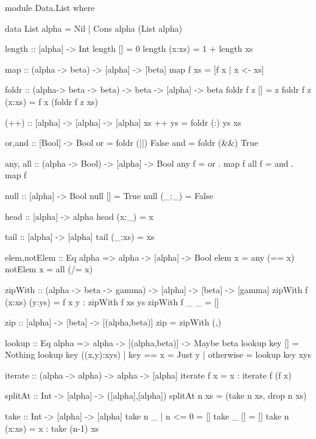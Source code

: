 
\begin{code}
module Data.List where

data List alpha = Nil | Cons alpha (List alpha)

length :: [alpha] -> Int
length []      = 0
length (x:xs)  = 1 + length xs

map :: (alpha -> beta) -> [alpha] -> [beta]
map f xs = [f x | x <- xs]

foldr :: (alpha-> beta -> beta) -> beta -> [alpha] -> beta
foldr f z []       = z
foldr f z (x:xs)   = f x (foldr f z xs)

(++) :: [alpha] -> [alpha] -> [alpha]
xs ++ ys = foldr (:) ys xs

or,and :: [Bool] -> Bool
or   = foldr (||)  False
and  = foldr (&&)  True

any, all :: (alpha -> Bool) -> [alpha] -> Bool
any  f = or    . map f
all  f = and   . map f

null :: [alpha] -> Bool
null []     = True
null (_:_)  = False

head :: [alpha] -> alpha
head (x:_) = x

tail :: [alpha] -> [alpha]
tail (_:xs) = xs

elem,notElem :: Eq alpha => alpha -> [alpha] -> Bool
elem     x = any  (==  x)
notElem  x = all  (/=  x)

zipWith :: (alpha -> beta -> gamma) -> [alpha] -> [beta] -> [gamma]
zipWith f (x:xs) (y:ys) = f x y : zipWith f xs ys
zipWith f _ _ = []

zip :: [alpha] -> [beta] -> [(alpha,beta)]
zip = zipWith (,)

lookup :: Eq alpha => alpha -> [(alpha,beta)] -> Maybe beta
lookup key []           =  Nothing
lookup key ((x,y):xys)  | key == x   = Just y
                        | otherwise  = lookup key xys

iterate :: (alpha -> alpha) -> alpha -> [alpha]
iterate f x = x : iterate f (f x)

splitAt :: Int -> [alpha] -> ([alpha],[alpha])
splitAt n xs = (take n xs, drop n xs)

take :: Int -> [alpha] -> [alpha]
take n _  | n <= 0  = []
take _ []           = []
take n (x:xs)       = x : take (n-1) xs


\end{code}
